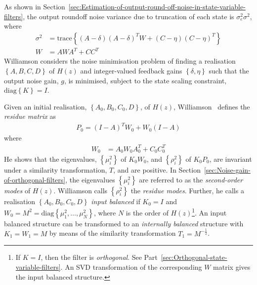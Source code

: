 \documentclass[a4paper,twoside,10pt,english]{report}
\begin{document}
As shown in 
Section~\ref{sec:Estimation-of-output-round-off-noise-in-state-variable-filters},
the output roundoff noise variance due to truncation of each state is 
$\sigma_{e}^{2}\sigma^{2}$, where
\begin{align*}
\sigma^{2}&=\text{trace}\left\{\left(A-\delta\right)\left(A-\delta\right)^{T}W+
\left(C-\eta\right)\left(C-\eta\right)^{T}\right\}\\
W&=AWA^{T}+CC^{T}
\end{align*}
Williamson considers the noise minimisation problem of finding a realisation 
$\left\{A,B,C,D\right\}$ of $H\left(z\right)$ and integer-valued feedback
gains $\left\{\delta,\eta\right\}$ such that the output noise gain, $g$,
is minimised, subject to the state scaling constraint,
$\text{diag}\left\{K\right\}=I$.

Given an initial realisation, $\left\{A_{0},B_{0},C_{0},D\right\}$, of 
$H\left(z\right)$, Williamson~\cite[Section III]
{Williamson_RoundoffNoiseMinimizationUsingResidueFeedback} defines the 
\emph{residue matrix} as
\begin{align*}
P_{0}=\left(I-A\right)^{T}W_{0}+W_{0}\left(I-A\right)
\end{align*}
where
\begin{align*}
W_{0}&=A_{0}W_{0}A_{0}^{T}+C_{0}C_{0}^{T}
\end{align*}
He shows that the eigenvalues, $\left\{\mu^{2}_{i}\right\}$ of $K_{0}W_{0}$,
and $\left\{\rho^{2}_{i}\right\}$ of $K_{0}P_{0}$, are invariant under a 
similarity transformation, $T$, and are positive. In 
Section~\ref{sec:Noise-gain-of-orthogonal-filters}, the eigenvalues 
$\left\{\mu^{2}_{i}\right\}$ are referred to as the \emph{second-order modes} of 
$H\left(z\right)$. Williamson calls $\left\{\rho^{2}_{i}\right\}$ the 
\emph{residue modes}. Further, he calls a realisation
$\left\{A_{0},B_{0},C_{0},D\right\}$ \emph{input balanced} if $K_{0}=I$ and
$W_{0}=M^{2}=\text{diag}\left\{\mu_{1}^{2},\hdots,\mu_{N}^{2}\right\}$, where
$N$ is the order of $H\left(z\right)$\footnote{If $K=I$, then the
filter is \emph{orthogonal}. See 
Part~\ref{sec:Orthogonal-state-variable-filters}. An SVD transformation of the
corresponding $W$ matrix gives the input balanced structure.}. An input balanced
structure can be transformed to an \emph{internally balanced} structure with 
$K_{1}=W_{1}=M$ by means of the similarity transformation $T_{1}=M^{-\frac{1}{2}}$.
\end{document}

